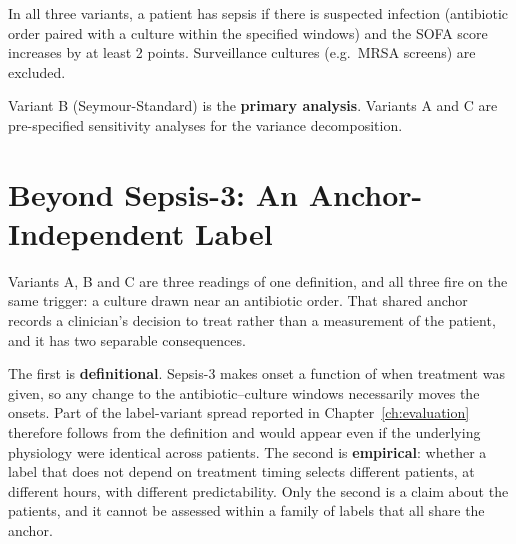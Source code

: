 \begin{table}[H]
    \centering\small
    \caption{Three pre-registered Sepsis-3 label variants. ABX = antibiotic;
    cx = culture; SOFA$-$/SOFA$+$ = hours before/after suspicion time in which
    a SOFA rise of $\geq 2$ must be observed. Baseline = SOFA reference value.}
    \label{tab:label_variants}
\end{table}

In all three variants, a patient has sepsis if there is suspected infection
(antibiotic order paired with a culture within the specified windows) and the
SOFA score increases by at least 2 points. Surveillance cultures (e.g.\ MRSA
screens) are excluded.

Variant B (Seymour-Standard) is the \textbf{primary analysis}. Variants A and C
are pre-specified sensitivity analyses for the variance decomposition.


\section{Beyond Sepsis-3: An Anchor-Independent Label}
\label{sec:alt_labels}

Variants A, B and C are three readings of one definition, and all three fire on
the same trigger: a culture drawn near an antibiotic order. That shared anchor
records a clinician's decision to treat rather than a measurement of the
patient, and it has two separable consequences.

The first is \textbf{definitional}. Sepsis-3 \cite{singer2016sepsis3} makes
onset a function of when treatment was given, so any change to the
antibiotic--culture windows necessarily moves the onsets. Part of the
label-variant spread reported in Chapter~\ref{ch:evaluation} therefore follows
from the definition and would appear even if the underlying physiology were
identical across patients. The second is \textbf{empirical}: whether a label
that does not depend on treatment timing selects different patients, at
different hours, with different predictability. Only the second is a claim
about the patients, and it cannot be assessed within a family of labels that
all share the anchor.


